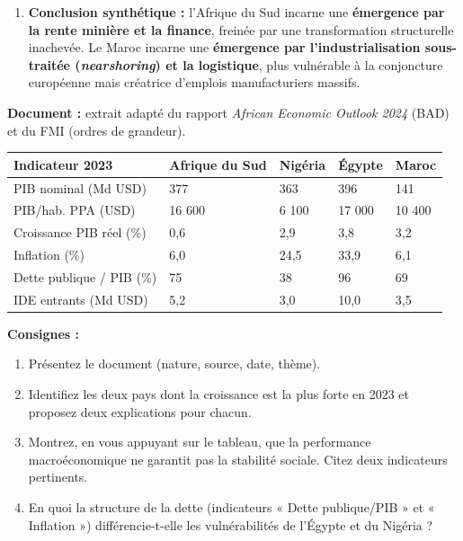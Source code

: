 \documentclass[11pt]{article}
\begin{document}
\begin{exoresolu}
\begin{enumerate}
\begin{itemize}
        \item \textbf{Intégration régionale :} l'Afrique du Sud est le moteur de la SADC et le pont vers l'Afrique australe. Le Maroc est un hub vers l'Afrique de l'Ouest (projet de gazoduc Nigéria-Maroc, banques Attijariwafa et BMCE présentes au Sahel) et a réintégré l'Union africaine en 2017.
    \end{itemize}
    \item \textbf{Conclusion synthétique :} l'Afrique du Sud incarne une \textbf{émergence par la rente minière et la finance}, freinée par une transformation structurelle inachevée. Le Maroc incarne une \textbf{émergence par l'industrialisation sous-traitée (\emph{nearshoring}) et la logistique}, plus vulnérable à la conjoncture européenne mais créatrice d'emplois manufacturiers massifs.
\end{enumerate}
\end{exoresolu}

\begin{exercice}
\textbf{Document :} extrait adapté du rapport \emph{African Economic Outlook 2024} (BAD) et du FMI (ordres de grandeur).
\begin{center}
\begin{tabularx}{\linewidth}{|l|X|X|X|X|}\hline
\rowcolor{popblueL}
\textbf{Indicateur 2023} & \textbf{Afrique du Sud} & \textbf{Nigéria} & \textbf{Égypte} & \textbf{Maroc} \\ \hline
PIB nominal (Md USD) & 377 & 363 & 396 & 141 \\ \hline
PIB/hab. PPA (USD) & 16 600 & 6 100 & 17 000 & 10 400 \\ \hline
Croissance PIB réel (\%) & 0,6 & 2,9 & 3,8 & 3,2 \\ \hline
Inflation (\%) & 6,0 & 24,5 & 33,9 & 6,1 \\ \hline
Dette publique / PIB (\%) & 75 & 38 & 96 & 69 \\ \hline
IDE entrants (Md USD) & 5,2 & 3,0 & 10,0 & 3,5 \\ \hline
\end{tabularx}
\end{center}
\textbf{Consignes :}
\begin{enumerate}
    \item Présentez le document (nature, source, date, thème).
    \item Identifiez les deux pays dont la croissance est la plus forte en 2023 et proposez deux explications pour chacun.
    \item Montrez, en vous appuyant sur le tableau, que la performance macroéconomique ne garantit pas la stabilité sociale. Citez deux indicateurs pertinents.
    \item En quoi la structure de la dette (indicateurs « Dette publique/PIB » et « Inflation ») différencie-t-elle les vulnérabilités de l'Égypte et du Nigéria ?
\end{enumerate}
\end{exercice}
\end{document}
